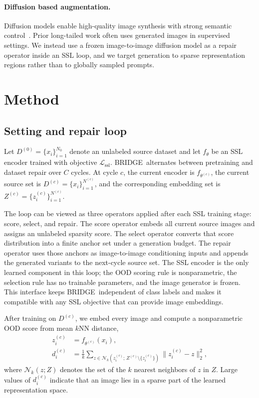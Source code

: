 \documentclass{article}
\newcommand{\method}{BRIDGE}
\begin{document}
\paragraph{Diffusion based augmentation.}
Diffusion models enable high-quality image synthesis with strong semantic control~\citep{ho2020denoising,rombach2022highresolution}. Prior long-tailed work often uses generated images in supervised settings. We instead use a frozen image-to-image diffusion model as a repair operator inside an SSL loop, and we target generation to sparse representation regions rather than to globally sampled prompts.

\section{Method}
\subsection{Setting and repair loop}
Let $D^{(0)} = \{x_i\}_{i=1}^{N_0}$ denote an unlabeled source dataset and let $f_{\theta}$ be an SSL encoder trained with objective $\mathcal{L}_{\mathrm{ssl}}$. \method\ alternates between pretraining and dataset repair over $C$ cycles. At cycle $c$, the current encoder is $f_{\theta^{(c)}}$, the current source set is $D^{(c)} = \{x_i\}_{i=1}^{N^{(c)}}$, and the corresponding embedding set is $Z^{(c)} = \{z_i^{(c)}\}_{i=1}^{N^{(c)}}$.

The loop can be viewed as three operators applied after each SSL training stage: score, select, and repair. The score operator embeds all current source images and assigns an unlabeled sparsity score. The select operator converts that score distribution into a finite anchor set under a generation budget. The repair operator uses those anchors as image-to-image conditioning inputs and appends the generated variants to the next-cycle source set. The SSL encoder is the only learned component in this loop; the OOD scoring rule is nonparametric, the selection rule has no trainable parameters, and the image generator is frozen. This interface keeps \method\ independent of class labels and makes it compatible with any SSL objective that can provide image embeddings.

After training on $D^{(c)}$, we embed every image and compute a nonparametric OOD score from mean $k$NN distance,
\begin{equation}
\begin{aligned}
    z_i^{(c)} &= f_{\theta^{(c)}}(x_i), \\
    d_i^{(c)} &= \frac{1}{k}\sum_{z \in \mathcal{N}_k\!\left(z_i^{(c)};\, Z^{(c)} \setminus \{z_i^{(c)}\}\right)}
    \bigl\lVert z_i^{(c)} - z \bigr\rVert_2^2,
\end{aligned}
\end{equation}
where $\mathcal{N}_k(z; Z)$ denotes the set of the $k$ nearest neighbors of $z$ in $Z$. Large values of $d_i^{(c)}$ indicate that an image lies in a sparse part of the learned representation space.
\end{document}
